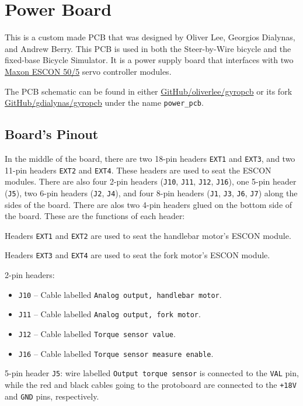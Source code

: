 \section{Power Board}
This is a custom made PCB that was designed by Oliver Lee, Georgios Dialynas, and Andrew Berry. This PCB is used in both the Steer-by-Wire bicycle and the fixed-base Bicycle Simulator. It is a power supply board that interfaces with two \href{https://www.maxongroup.com/maxon/view/product/control/4-Q-Servokontroller/438725}{Maxon ESCON 50/5} servo controller modules.

The PCB schematic can be found in either \href{https://github.com/oliverlee/gyropcb}{GitHub/oliverlee/gyropcb} or its fork \href{https://github.com/gdialynas/gyropcb}{GitHub/gdialynas/gyropcb} under the name \verb|power_pcb|.

\subsection{Board's Pinout}
In the middle of the board, there are two 18-pin headers \verb|EXT1| and \verb|EXT3|, and two 11-pin headers \verb|EXT2| and \verb|EXT4|. These headers are used to seat the ESCON modules. There are also four 2-pin headers (\verb|J10|, \verb|J11|, \verb|J12|, \verb|J16|), one 5-pin header (\verb|J5|), two 6-pin headers (\verb|J2|, \verb|J4|), and four 8-pin headers (\verb|J1|, \verb|J3|, \verb|J6|, \verb|J7|) along the sides of the board. There are alos two 4-pin headers glued on the bottom side of the board. These are the functions of each header:

Headers \verb|EXT1| and \verb|EXT2| are used to seat the handlebar motor's ESCON module.

Headers \verb|EXT3| and \verb|EXT4| are used to seat the fork motor's ESCON module.

2-pin headers:
\begin{itemize}[noitemsep]
  \item \verb|J10| -- Cable labelled \verb|Analog output, handlebar motor|.
  \item \verb|J11| -- Cable labelled \verb|Analog output, fork motor|.
  \item \verb|J12| -- Cable labelled \verb|Torque sensor value|.
  \item \verb|J16| -- Cable labelled \verb|Torque sensor measure enable|.
\end{itemize}

5-pin header \verb|J5|: wire labelled \verb|Output torque sensor| is connected to the \verb|VAL| pin, while the red and black cables going to the protoboard are connected to the \verb|+18V| and \verb|GND| pins, respectively.

